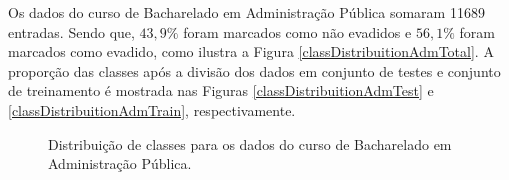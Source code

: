 Os dados do curso de Bacharelado em Administração Pública somaram 11689
entradas. Sendo que, $43,9\%$ foram marcados como não evadidos e $56,1\%$ foram
marcados como evadido, como ilustra a Figura \ref{classDistribuitionAdmTotal}. A
proporção das classes após a divisão dos dados em conjunto de testes e conjunto
de treinamento é mostrada nas Figuras \ref{classDistribuitionAdmTest} e
\ref{classDistribuitionAdmTrain}, respectivamente.

\begin{figure}[!htb]
  \centering
  \caption{\label{classDistribuitionAdm} Distribuição de classes para os dados do curso de Bacharelado em Administração Pública.}
  \qquad
  \qquad

\end{figure}
